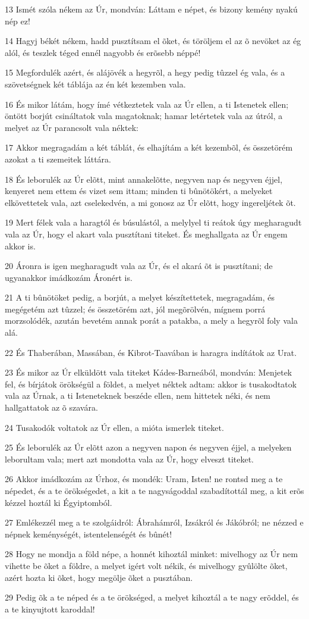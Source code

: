 \par 13 Ismét szóla nékem az Úr, mondván: Láttam e népet, és bizony kemény nyakú nép ez!
\par 14 Hagyj békét nékem, hadd pusztítsam el õket, és töröljem el az õ nevöket az ég alól, és teszlek téged ennél nagyobb és erõsebb néppé!
\par 15 Megfordulék azért, és alájövék a hegyrõl, a hegy pedig tûzzel ég vala, és a szövetségnek két táblája az én két kezemben vala.
\par 16 És mikor látám, hogy ímé vétkeztetek vala az Úr ellen, a ti Istenetek ellen; öntött borjút csináltatok vala magatoknak; hamar letértetek vala az útról, a melyet az Úr parancsolt vala néktek:
\par 17 Akkor megragadám a két táblát, és elhajítám a két kezembõl, és összetörém azokat a ti szemeitek láttára.
\par 18 És leborulék az Úr elõtt, mint annakelõtte, negyven nap és negyven éjjel, kenyeret nem ettem és vizet sem ittam; minden ti bûnötökért, a melyeket elkövettetek vala, azt cselekedvén, a mi gonosz az Úr elõtt, hogy ingereljétek õt.
\par 19 Mert félek vala a haragtól és búsulástól, a melylyel ti reátok úgy megharagudt vala az Úr, hogy el akart vala pusztítani titeket. És meghallgata az Úr engem akkor is.
\par 20 Áronra is igen megharagudt vala az Úr, és el akará õt is pusztítani; de ugyanakkor imádkozám Áronért is.
\par 21 A ti bûnötöket pedig, a borjút, a melyet készítettetek, megragadám, és megégetém azt tûzzel; és összetörém azt, jól megõrölvén, mígnem porrá morzsolódék, azután bevetém annak porát a patakba, a mely a hegyrõl foly vala alá.
\par 22 És Thaberában, Massában,  és Kibrot-Taavában is haragra indítátok az Urat.
\par 23 És mikor az Úr elküldött vala titeket Kádes-Barneából, mondván: Menjetek fel, és bírjátok örökségül a földet, a melyet néktek adtam: akkor is tusakodtatok vala az Úrnak, a ti Isteneteknek beszéde ellen, nem hittetek néki, és nem hallgattatok az õ szavára.
\par 24 Tusakodók voltatok az Úr ellen, a mióta ismerlek titeket.
\par 25 És leborulék az Úr elõtt azon a negyven napon és negyven éjjel, a melyeken leborultam vala; mert azt mondotta vala az Úr, hogy elveszt titeket.
\par 26 Akkor imádkozám az Úrhoz, és mondék: Uram, Isten! ne rontsd meg a te népedet, és a te örökségedet, a kit a te nagyságoddal szabadítottál meg, a kit erõs kézzel hoztál ki Égyiptomból.
\par 27 Emlékezzél meg a te szolgáidról: Ábrahámról, Izsákról és Jákóbról; ne nézzed e népnek keménységét, istentelenségét és bûnét!
\par 28 Hogy ne mondja a föld népe, a honnét kihoztál minket: mivelhogy az Úr nem vihette be õket a földre, a melyet igért volt nékik, és mivelhogy gyûlölte õket, azért hozta ki õket, hogy megölje õket a pusztában.
\par 29 Pedig õk a te néped és a te örökséged, a melyet kihoztál a te nagy erõddel, és a te kinyujtott karoddal!

